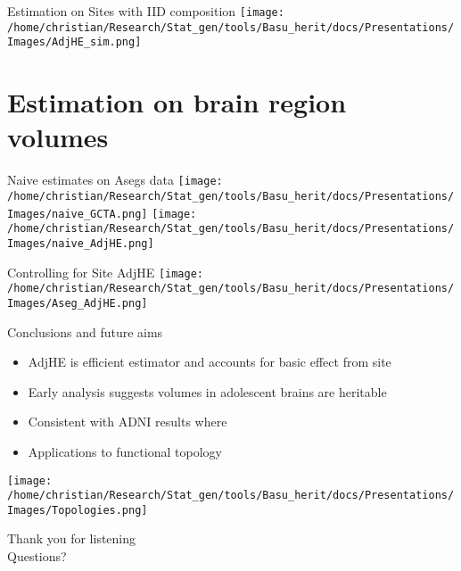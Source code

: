 \documentclass[
  ignorenonframetext,
]{beamer}
\begin{document}
\begin{frame}{Estimation on Sites with IID composition}
\centering
\texttt{[image: /home/christian/Research/Stat\_gen/tools/Basu\_herit/docs/Presentations/Images/AdjHE\_sim.png]}
\end{frame}

\section{Estimation on brain region volumes}
\begin{frame}{Naive estimates on Asegs data}
\texttt{[image: /home/christian/Research/Stat\_gen/tools/Basu\_herit/docs/Presentations/Images/naive\_GCTA.png]}
\texttt{[image: /home/christian/Research/Stat\_gen/tools/Basu\_herit/docs/Presentations/Images/naive\_AdjHE.png]}


\end{frame}


\begin{frame}{Controlling for Site AdjHE}
\texttt{[image: /home/christian/Research/Stat\_gen/tools/Basu\_herit/docs/Presentations/Images/Aseg\_AdjHE.png]}

\end{frame}






\begin{frame}{Conclusions and future aims}
\begin{itemize}
	\item AdjHE is efficient estimator and accounts for basic effect from site
	\item Early analysis suggests volumes in adolescent brains are heritable
	\item Consistent with ADNI results where
	\item Applications to functional topology
\end{itemize}
\centering
\texttt{[image: /home/christian/Research/Stat\_gen/tools/Basu\_herit/docs/Presentations/Images/Topologies.png]}

\end{frame}


\begin{frame}
\begin{Huge}
Thank you for listening \\
Questions?
\end{Huge}
\end{frame}
\end{document}
